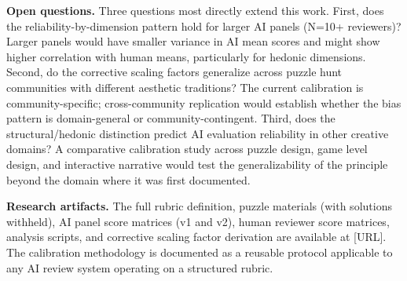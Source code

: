 \textbf{Open questions.} Three questions most directly extend this work. First, does the reliability-by-dimension pattern hold for larger AI panels (N=10+ reviewers)? Larger panels would have smaller variance in AI mean scores and might show higher correlation with human means, particularly for hedonic dimensions. Second, do the corrective scaling factors generalize across puzzle hunt communities with different aesthetic traditions? The current calibration is community-specific; cross-community replication would establish whether the bias pattern is domain-general or community-contingent. Third, does the structural/hedonic distinction predict AI evaluation reliability in other creative domains? A comparative calibration study across puzzle design, game level design, and interactive narrative would test the generalizability of the principle beyond the domain where it was first documented.

\textbf{Research artifacts.} The full rubric definition, puzzle materials (with solutions withheld), AI panel score matrices (v1 and v2), human reviewer score matrices, analysis scripts, and corrective scaling factor derivation are available at [URL]. The calibration methodology is documented as a reusable protocol applicable to any AI review system operating on a structured rubric.
